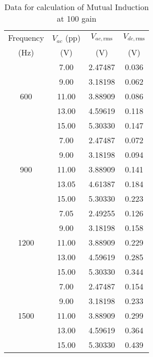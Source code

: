 \begin{table}[H]
    \centering
    \begin{tabular}{|c|c|c|c|}
    \hline
    Frequency& $V_{ac}$ (pp)& $V_{ac, \text{rms}}$ & $V_{dc, \text{rms}}$ \\
    (Hz) & (V) & (V)&  (V) \\ \hline
    \multirow{5}{*}{600} & 7.00 & 2.47487 & 0.036 \\ \cline{2-4} 
    & 9.00 & 3.18198 & 0.062 \\ \cline{2-4} 
    & 11.00 & 3.88909 & 0.086 \\ \cline{2-4} 
    & 13.00 & 4.59619 & 0.118 \\ \cline{2-4} 
    & 15.00 & 5.30330 & 0.147 \\ \hline
   \multirow{5}{*}{900} & 7.00 & 2.47487 & 0.072 \\ \cline{2-4} 
    & 9.00 & 3.18198 & 0.094 \\ \cline{2-4} 
    & 11.00 & 3.88909 & 0.141 \\ \cline{2-4} 
    & 13.05 & 4.61387 & 0.184 \\ \cline{2-4} 
    & 15.00 & 5.30330 & 0.223 \\ \hline
   \multirow{5}{*}{1200} & 7.05 & 2.49255 & 0.126 \\ \cline{2-4} 
    & 9.00 & 3.18198 & 0.158 \\ \cline{2-4} 
    & 11.00 & 3.88909 & 0.229 \\ \cline{2-4} 
    & 13.00 & 4.59619 & 0.285 \\ \cline{2-4} 
    & 15.00 & 5.30330 & 0.344 \\ \hline
   \multirow{5}{*}{1500} & 7.00 & 2.47487 & 0.154 \\ \cline{2-4} 
    & 9.00 & 3.18198 & 0.233 \\ \cline{2-4} 
    & 11.00 & 3.88909 & 0.299 \\ \cline{2-4} 
    & 13.00 & 4.59619 & 0.364 \\ \cline{2-4} 
    & 15.00 & 5.30330 & 0.439 \\ \hline
    \end{tabular}%
    \caption{Data for calculation of Mutual Induction at 100 gain}
    \label{mutual}
    \end{table}